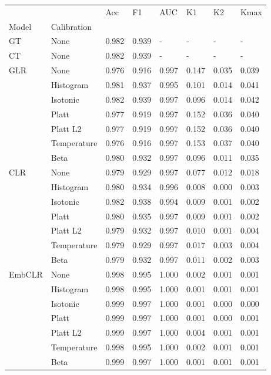 \begin{tabular}{llllllll}
\toprule
 &  & Acc & F1 & AUC & K1 & K2 & Kmax \\
Model & Calibration &  &  &  &  &  &  \\
\midrule
GT & None & 0.982 & 0.939 & - & - & - & - \\
\cline{1-8}
CT & None & 0.982 & 0.939 & - & - & - & - \\
\cline{1-8}
\multirow[t]{7}{*}{GLR} & None & 0.976 & 0.916 & 0.997 & 0.147 & 0.035 & 0.039 \\
 & Histogram & 0.981 & 0.937 & 0.995 & 0.101 & 0.014 & 0.041 \\
 & Isotonic & 0.982 & 0.939 & 0.997 & 0.096 & 0.014 & 0.042 \\
 & Platt & 0.977 & 0.919 & 0.997 & 0.152 & 0.036 & 0.040 \\
 & Platt L2 & 0.977 & 0.919 & 0.997 & 0.152 & 0.036 & 0.040 \\
 & Temperature & 0.976 & 0.916 & 0.997 & 0.153 & 0.037 & 0.040 \\
 & Beta & 0.980 & 0.932 & 0.997 & 0.096 & 0.011 & 0.035 \\
\cline{1-8}
\multirow[t]{7}{*}{CLR} & None & 0.979 & 0.929 & 0.997 & 0.077 & 0.012 & 0.018 \\
 & Histogram & 0.980 & 0.934 & 0.996 & 0.008 & 0.000 & 0.003 \\
 & Isotonic & 0.982 & 0.938 & 0.994 & 0.009 & 0.001 & 0.002 \\
 & Platt & 0.980 & 0.935 & 0.997 & 0.009 & 0.001 & 0.002 \\
 & Platt L2 & 0.979 & 0.932 & 0.997 & 0.010 & 0.001 & 0.004 \\
 & Temperature & 0.979 & 0.929 & 0.997 & 0.017 & 0.003 & 0.004 \\
 & Beta & 0.979 & 0.932 & 0.997 & 0.011 & 0.002 & 0.003 \\
\cline{1-8}
\multirow[t]{7}{*}{EmbCLR} & None & 0.998 & 0.995 & 1.000 & 0.002 & 0.001 & 0.001 \\
 & Histogram & 0.998 & 0.995 & 1.000 & 0.001 & 0.001 & 0.001 \\
 & Isotonic & 0.999 & 0.997 & 1.000 & 0.001 & 0.000 & 0.000 \\
 & Platt & 0.999 & 0.997 & 1.000 & 0.001 & 0.000 & 0.001 \\
 & Platt L2 & 0.999 & 0.997 & 1.000 & 0.004 & 0.001 & 0.001 \\
 & Temperature & 0.998 & 0.995 & 1.000 & 0.002 & 0.001 & 0.001 \\
 & Beta & 0.999 & 0.997 & 1.000 & 0.001 & 0.001 & 0.001 \\
\cline{1-8}
\bottomrule
\end{tabular}
